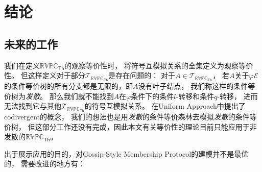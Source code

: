 \chapter{结论}


\section{未来的工作}
我们在定义$\mathbb{RVPC}_{\mathsf{Th}}$的观察等价性时，
将符号互模拟关系的全集定义为观察等价性。
但这样定义对于部分$\mathcal{T}_{\mathbb{RVPC}_{\mathsf{Th}}}$是存在问题的：
对于$A\in \mathcal{T}_{\mathbb{RVPC}_{\mathsf{Th}}}$，
若$A$关于$\varphi\mathcal{E}$的条件等价树的所有分支都是无限的，即$A$没有叶子结点，
我们称这样的条件等价树为\textit{发散}。
那么我们就不能找到$A$在$\varphi$条件下的条件$l$-转移和条件$q$-转移，
进而无法找到它与其他$\mathcal{T}_{\mathbb{RVPC}_{\mathsf{Th}}}$的符号互模拟关系。
在Uniform Approach中提出了codivergent的概念，
我们的想法也是用\textit{发散}的条件等价森林去模拟\textit{发散}的条件等价树，
但这部分工作还没有完成，因此本文有关等价性的理论目前只能应用于非发散的$\mathbb{RVPC}_{\mathsf{Th}}$。

出于展示应用的目的，对Gossip-Style Membership Protocol的建模并不是最优的，
需要改进的地方有：